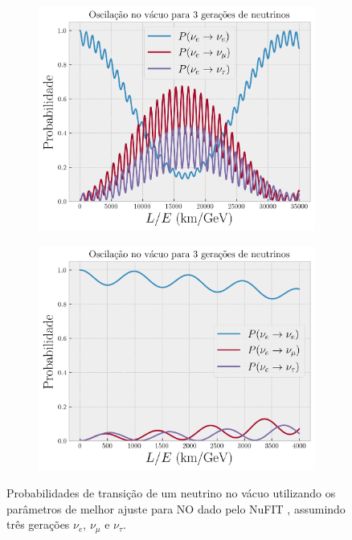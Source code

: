 \documentclass[12pt]{report}
\begin{document}
\begin{figure}[H]
\centering
\begin{subfigure}{.5\textwidth}
  \centering
  \includegraphics[width=.95\linewidth]{fig/3nu-vacuo-e.png}
  \caption{}
  \label{fig:vacuo-e}
\end{subfigure}%
\begin{subfigure}{.5\textwidth}
  \centering
  \includegraphics[width=.95\linewidth]{fig/3nu-vacuo-e_short.png}
  \caption{}
  \label{fig:vacuo-e_short}
\end{subfigure}
\caption{Probabilidades de transição de um neutrino no vácuo utilizando os parâmetros de melhor ajuste para NO dado pelo NuFIT \cite{nufit}, assumindo três gerações $\nu_e$, $\nu_\mu$ e $\nu_\tau$.}
\label{fig:vacuo_electron}
\end{figure}
\end{document}
